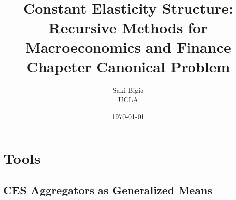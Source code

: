 \documentclass[12pt,openany]{book}
\title{Constant Elasticity Structure: \\ Recursive Methods for Macroeconomics and Finance \\ Chapeter Canonical Problem}
\author{Saki Bigio \\UCLA}
\date{\today}
\begin{document}
\frontmatter
\maketitle

\tableofcontents

\mainmatter

\part{Tools}
\label{part:tools}

\chapter{CES Aggregators as Generalized Means}
\label{ch:ces-aggregators}



\backmatter


\end{document}
